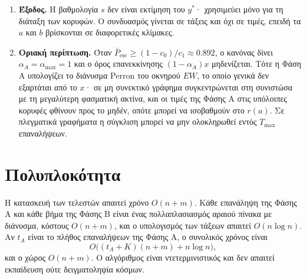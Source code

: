 \documentclass[11pt,a4paper]{article}
\newcommand{\Pescbar}{\bar{P}_{\mathrm{esc}}}
\newcommand{\Pthr}{0.892}
\begin{document}
\begin{enumerate}[leftmargin=1.5em,itemsep=3pt]
\item \textbf{Έξοδος.} Η βαθμολογία $s$ δεν είναι εκτίμηση του $y^*$· χρησιμεύει μόνο για τη διάταξη των κορυφών. Ο συνδυασμός γίνεται σε τάξεις και όχι σε τιμές, επειδή τα $a$ και $b$ βρίσκονται σε διαφορετικές κλίμακες.

\item \textbf{Οριακή περίπτωση.} Όταν $\Pescbar\ge(1-c_0)/c_1\approx\Pthr$, ο κανόνας δίνει $\alpha_A=\alpha_{\max}=1$ και ο όρος επανεκκίνησης $(1-\alpha_A)x$ μηδενίζεται. Τότε η Φάση Α υπολογίζει το διάνυσμα Perron του οκνηρού $EW$, το οποίο γενικά δεν εξαρτάται από το $x$· σε μη συνεκτικό γράφημα συγκεντρώνεται στη συνιστώσα με τη μεγαλύτερη φασματική ακτίνα, και οι τιμές της Φάσης Α στις υπόλοιπες κορυφές φθίνουν προς το μηδέν, οπότε μπορεί να ισοβαθμούν στο $r(a)$. Σε πλεγματικά γραφήματα η σύγκλιση μπορεί να μην ολοκληρωθεί εντός $T_{\max}$ επαναλήψεων.
\end{enumerate}

\section{Πολυπλοκότητα}

Η κατασκευή των τελεστών απαιτεί χρόνο $O(n+m)$. Κάθε επανάληψη της Φάσης Α και κάθε βήμα της Φάσης Β είναι ένας πολλαπλασιασμός αραιού πίνακα με διάνυσμα, κόστους $O(n+m)$, και ο υπολογισμός των τάξεων απαιτεί $O(n\log n)$. Αν $t_A$ είναι το πλήθος επαναλήψεων της Φάσης Α, ο συνολικός χρόνος είναι
\[
O\big((t_A+K)(n+m)+n\log n\big),
\]
και ο χώρος $O(n+m)$. Ο αλγόριθμος είναι ντετερμινιστικός και δεν απαιτεί εκπαίδευση ούτε δειγματοληψία κόσμων.
\end{document}
